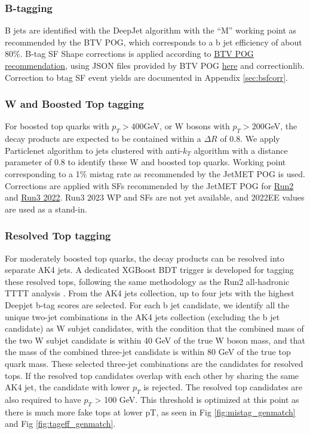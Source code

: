 \documentclass[twoside]{article}
\begin{document}
\subsubsection{B-tagging}

B jets are identified with the DeepJet algorithm with the ``M'' working point as recommended by the BTV POG, which corresponds to a b jet efficiency of about 80\%. B-tag SF Shape corrections is applied according to \href{https://btv-wiki.docs.cern.ch/PerformanceCalibration/shapeCorrectionSFRecommendations/}{BTV POG recommendation}, using JSON files provided by BTV POG \href{https://gitlab.cern.ch/cms-nanoAOD/jsonpog-integration/-/tree/master/POG/BTV}{here} and correctionlib. Correction to btag SF event yields are documented in Appendix \ref{sec:bsfcorr}.

\subsubsection{W and Boosted Top tagging}

For boosted top quarks with $p_T > 400$GeV, or W bosons with $p_T > 200$GeV, the decay products are expected to be contained within a $\Delta R $ of 0.8. We apply Particlenet algorithm to jets clustered with anti-$k_T$ algorithm with a distance parameter of 0.8 to identify these W and boosted top quarks. Working point corresponding to a 1\% mistag rate as recommended by the JetMET POG is used. Corrections are applied with SFs recommended by the JetMET POG for \href{https://twiki.cern.ch/twiki/bin/view/CMS/ParticleNetSFs}{Run2} and \href{https://indico.cern.ch/event/1459087/#20-update-on-topw-particlenet}{Run3 2022}. Run3 2023 WP and SFs are not yet available, and 2022EE values are used as a stand-in.

\subsubsection{Resolved Top tagging}
\label{sec:restop}

For moderately boosted top quarks, the decay products can be resolved into separate AK4 jets. A dedicated XGBoost BDT trigger is developed for tagging these resolved tops, following the same methodology as the Run2 all-hadronic TTTT analysis \cite{prev_ftop_analysis}. From the AK4 jets collection, up to four jets with the highest Deepjet b-tag scores are selected. For each b jet candidate, we identify all the unique two-jet combinations in the AK4 jets collection (excluding the b jet candidate) as  W subjet candidates, with the condition that the combined mass of the two W subjet candidate is within 40 GeV of the true W boson mass, and that the mass of the combined three-jet candidate is within 80 GeV of the true top quark mass. These selected three-jet combinations are the candidates for resolved tops. If the resolved top candidates overlap with each other by sharing the same AK4 jet, the candidate with lower $p_T$ is rejected. The resolved top candidates are also required to have $p_T$ > 100 GeV. This threshold is optimized at this point as there is much more fake tops at lower pT, as seen in Fig \ref{fig:mistag_genmatch} and Fig \ref{fig:tageff_genmatch}.
\end{document}
